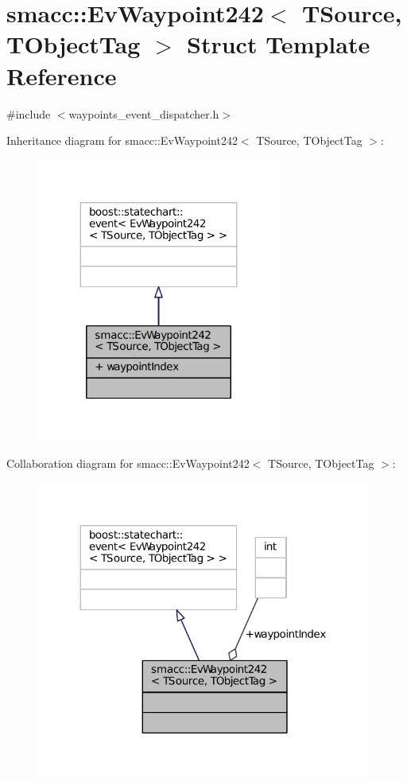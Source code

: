 \hypertarget{structsmacc_1_1EvWaypoint242}{}\section{smacc\+:\+:Ev\+Waypoint242$<$ T\+Source, T\+Object\+Tag $>$ Struct Template Reference}
\label{structsmacc_1_1EvWaypoint242}


{\ttfamily \#include $<$waypoints\+\_\+event\+\_\+dispatcher.\+h$>$}



Inheritance diagram for smacc\+:\+:Ev\+Waypoint242$<$ T\+Source, T\+Object\+Tag $>$\+:
\nopagebreak
\begin{figure}[H]
\begin{center}
\leavevmode
\includegraphics[width=227pt]{structsmacc_1_1EvWaypoint242__inherit__graph}
\end{center}
\end{figure}


Collaboration diagram for smacc\+:\+:Ev\+Waypoint242$<$ T\+Source, T\+Object\+Tag $>$\+:
\nopagebreak
\begin{figure}[H]
\begin{center}
\leavevmode
\includegraphics[width=312pt]{structsmacc_1_1EvWaypoint242__coll__graph}
\end{center}
\end{figure}
